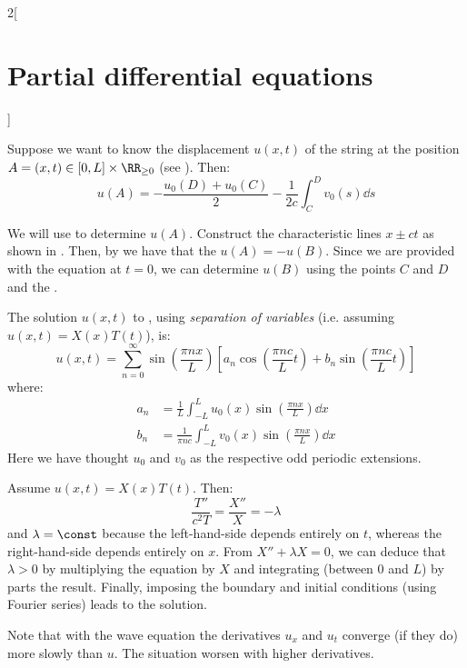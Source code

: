 \documentclass[../../../main_math.tex]{subfiles}
\begin{document}
\begin{multicols}{2}[\section{Partial differential equations}]
\begin{proposition}
    Suppose we want to know the displacement $u(x,t)$ of the string at the position $A=(x,t)\in[0,L]\times\RR_{\geq 0}$ (see ). Then:
    $$u(A)=-\frac{u_0(D)+u_0(C)}{2}-\frac{1}{2c}\int_{C}^{D}v_0(s)\dd{s}$$
  \end{proposition}
  \begin{sproof}
    We will use  to determine $u(A)$. Construct the characteristic lines $x\pm ct$ as shown in . Then, by  we have that the $u(A) = - u(B)$. Since we are provided with the equation at $t=0$, we can determine $u(B)$ using the points $C$ and $D$ and the .
  \end{sproof}
  \begin{center}
    \begin{minipage}{\linewidth}
      \centering
      
      \label{PDE:waves-char-solve}
    \end{minipage}
  \end{center}
  \begin{proposition}
    The solution $u(x,t)$ to , using \emph{separation of variables} (i.e. assuming $u(x,t)=X(x)T(t)$), is: $$u(x,t)=\sum_{n=0}^\infty \sin\left(\frac{\pi n x}{L}\right)\left[a_n\cos\left(\frac{\pi n c}{L}t\right)+ b_n\sin\left( \frac{\pi n c}{L}t\right)\right]$$ where:
    \begin{align*}
      a_n & =\frac{1}{L}\int_{-L}^Lu_0(x)\sin\left(\frac{\pi n x}{L}\right)\dd{x}       \\
      b_n & =\frac{1}{\pi n c}\int_{-L}^Lv_0(x)\sin\left(\frac{\pi n x}{L}\right)\dd{x}
    \end{align*}
    Here we have thought $u_0$ and $v_0$ as the respective odd periodic extensions.
  \end{proposition}
  \begin{sproof}
    Assume $u(x,t)=X(x)T(t)$. Then: $$\frac{T''}{c^2T}=\frac{X''}{X}=-\lambda$$ and $\lambda=\const$ because the left-hand-side depends entirely on $t$, whereas the right-hand-side depends entirely on $x$. From $X''+\lambda X=0$, we can deduce that $\lambda>0$ by multiplying the equation by $X$ and integrating (between 0 and $L$) by parts the result. Finally, imposing the boundary and initial conditions (using Fourier series) leads to the solution.
  \end{sproof}
  \begin{remark}
    Note that with the wave equation the derivatives $u_x$ and $u_t$ converge (if they do) more slowly than $u$. The situation worsen with higher derivatives.
  \end{remark}

\end{multicols}
\end{document}
